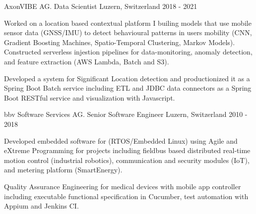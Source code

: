 

\begin{cventries}

  \cventry
    {AxonVIBE AG.} %
    {Data Scientist} %
    {Luzern, Switzerland} %
    {2018 - 2021} %
    {
      \begin{cvitems} %
        \item {
            Worked on a location based contextual platform I builing models that use
            mobile sensor data (GNSS/IMU) to detect behavioural patterns in users 
            mobility (CNN, Gradient Boosting Machines, Spatio-Temporal Clustering, Markov Models).
            Constructed serverless injestion pipelines for data-monitoring, anomaly detection, 
            and feature extraction (AWS Lambda, Batch and S3).}
        \item {
            Developed a system for Significant Location detection and productionized it
            as a Spring Boot Batch service including ETL and JDBC data connectors as a Spring Boot RESTful service and 
            visualization with Javascript.}
      \end{cvitems}
    }

\cventry
{bbv Software Services AG.} %
{Senior Software Engineer} %
{Luzern, Switzerland} %
{2010 - 2018} %
{
  \begin{cvitems} %
    \item {
        Developed embedded software for (RTOS/Embedded Linux) using 
        Agile and eXtreme Programming for projects including fieldbus based distributed real-time 
        motion control (industrial robotics), communication and security modules (IoT),
        and metering platform (SmartEnergy).}
    \item {
        Quality Assurance Engineering for medical devices with mobile app controller
        including executable functional specification in Cucumber, test automation with Appium
        and Jenkins CI. 
        }
  \end{cvitems}
}


\end{cventries}
